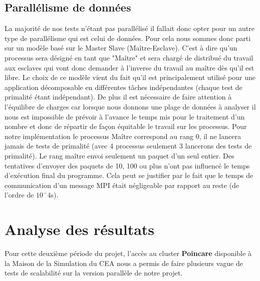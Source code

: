 		\subsection{Parallélisme de données}
		La majorité de nos tests n'étant pas parallélisé il fallait donc opter pour un autre type de parallélisme qui est celui de données. Pour cela nous sommes donc parti sur un modèle basé sur le Master Slave (Maître-Esclave). C'est à dire qu'un processus sera désigné en tant que "Maître" et sera chargé de distribué du travail aux esclaves qui vont donc demander à l'inverse du travail au maître dès qu'il est libre.  Le choix de ce modèle vient du fait qu'il est principalement utilisé pour une application décomposable en différentes tâches indépendantes (chaque test de primalité étant indépendant). De plus il est nécessaire de faire attention à l'équilibre de charges car lorsque nous donnons une plage de données à analyser il nous est impossible de prévoir à l'avance le temps mis pour le traitement d'un nombre et donc de répartir de façon équitable le travail sur les processus. 
Pour notre implémentation le processus Maître correspond au rang 0, il ne lancera jamais de tests de primalité (avec 4 processus seulement 3 lancerons des tests de primalité). Le rang maître envoi seulement un paquet d'un seul entier. Des tentatives d'envoyer des paquets de 10, 100 ou plus n'ont pas influencé le temps d'exécution final du programme. Cela peut se justifier par le fait que le temps de communication d'un message MPI était négligeable par rapport au reste (de l'ordre de $10^-4$s).

	\section{Analyse des résultats}
	Pour cette deuxième période du projet, l'accès au cluster \textbf{Poincare} disponible à la Maison de la Simulation du CEA nous a permis de faire plusieurs vague de tests de scalabilité sur la version parallèle de notre projet.
	
